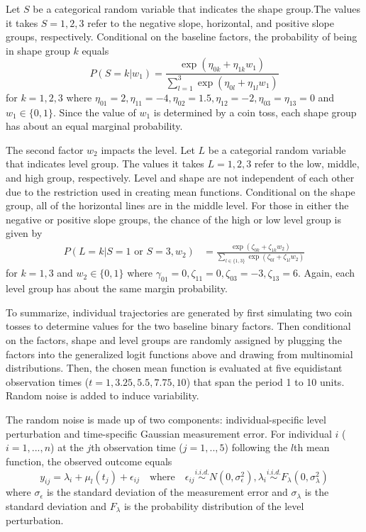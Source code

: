 Let $S$ be a categorical random variable that indicates the shape group.The values it takes $S=1,2,3$ refer to the negative slope, horizontal, and positive slope groups, respectively. Conditional on the baseline factors, the probability of being in shape group $k$ equals
$$P(S=k |w_{1}) = \frac{\exp(\eta_{0k}+\eta_{1k}w_{1})}{\sum^{3}_{l=1} \exp(\eta_{0l}+\eta_{1l}w_{1})}$$
for $k=1,2,3$ where $\eta_{01}=2,\eta_{11} = -4,\eta_{02}=1.5,\eta_{12}=-2,\eta_{03}=\eta_{13} = 0$ and $w_{1}\in\{0,1\}$. Since the value of $w_{1}$ is determined by a coin toss, each shape group has about an equal marginal probability. 

The second factor $w_{2}$ impacts the level. Let $L$ be a categorial random variable that indicates level group. The values it takes $L=1,2,3$ refer to the low, middle, and high group, respectively. Level and shape are not independent of each other due to the restriction used in creating mean functions. Conditional on the shape group, all of the horizontal lines are in the middle level. For those in either the negative or positive slope groups, the chance of the high or low level group is given by
\begin{align*}
P(L=k|S=1 \text{ or } S=3,w_{2}) & = \frac{\exp(\zeta_{0k}+\zeta_{1k} w_{2})}{\sum_{l\in\{1,3\} }\exp(\zeta_{0l}+\zeta_{1l}w_{2})}
\end{align*}
for $k=1,3$ and $w_{2}\in\{0,1\}$ where $\gamma_{01}=0,\zeta_{11}=0,\zeta_{03}=-3,\zeta_{13}=6$. Again, each level group has about the same margin probability.

To summarize, individual trajectories are generated by first simulating two coin tosses to determine values for the two baseline binary factors. Then conditional on the factors, shape and level groups are randomly assigned by plugging the factors into the generalized logit functions above and drawing from multinomial distributions. Then, the chosen mean function is evaluated at five equidistant observation times ($t=1,3.25,5.5,7.75,10$) that span the period 1 to 10 units. Random noise is added to induce variability. 

The random noise is made up of two components: individual-specific level perturbation and time-specific Gaussian measurement error. For individual $i$ ($i=1,...,n$) at the $j$th observation time ($j=1,..,5$) following the $l$th mean function, the observed outcome equals
$$y_{ij} = \lambda_{i}+\mu_{l}(t_{j})+\epsilon_{ij}\quad\text{where}\quad \epsilon_{ij}\stackrel{i.i.d.}{\sim} N(0,\sigma_{\epsilon}^{2}), \lambda_{i}\stackrel{i.i.d.}{\sim} F_{\lambda}(0,\sigma_{\lambda}^{2})$$
where $\sigma_{\epsilon}$  is the standard deviation of the measurement error and $\sigma_{\lambda}$ is the standard deviation and $F_{\lambda}$ is the probability distribution of the level perturbation.
 
